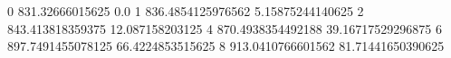 0 831.32666015625 0.0
1 836.4854125976562 5.15875244140625
2 843.413818359375 12.087158203125
4 870.4938354492188 39.16717529296875
6 897.7491455078125 66.4224853515625
8 913.0410766601562 81.71441650390625
